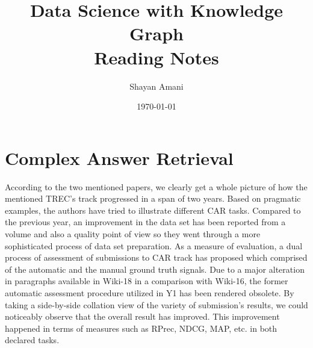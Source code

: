 \documentclass[letterpaper,12pt]{article}
\title{Data Science with Knowledge Graph \\{\large Reading Notes}}
\author{Shayan Amani}
\date{\today}
\begin{document}
\maketitle

\section{Complex Answer Retrieval}
According to the two mentioned papers, we clearly get a whole picture of how the mentioned TREC's track progressed in a span of two years. Based on pragmatic examples, the authors have tried to illustrate different CAR tasks. Compared to the previous year, an improvement in the data set has been reported from a volume and also a quality point of view so they went through a more sophisticated process of data set preparation. As a measure of evaluation, a dual process of assessment of submissions to CAR track has proposed which comprised of the automatic and the manual ground truth signals. Due to a major alteration in paragraphs available in Wiki-18 in a comparison with Wiki-16, the former automatic assessment procedure utilized in Y1 has been rendered obsolete. By taking a side-by-side collation view of the variety of submission's results, we could noticeably observe that the overall result has improved. This improvement happened in terms of measures such as RPrec, NDCG, MAP, etc. in both declared tasks.
\end{document}
